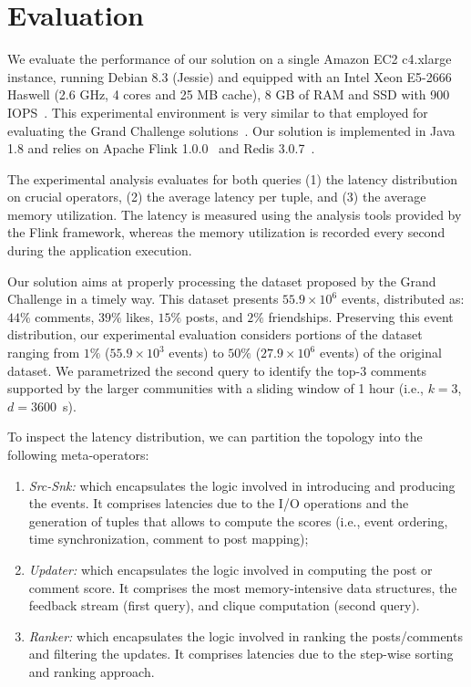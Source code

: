 \section{Evaluation}
\label{sec:evaluation}

We evaluate the performance of our solution on a single Amazon EC2 c4.xlarge instance, running Debian 8.3 (Jessie) and equipped with an Intel Xeon E5-2666 Haswell (2.6 GHz, 4 cores and 25 MB cache), 8 GB of RAM and SSD with 900 IOPS~\cite{AWSEC2InstanceTypes}. This experimental environment is very similar to that employed for evaluating the Grand Challenge solutions~\cite{GrandChallenge:2016}. 
%
Our solution is implemented in Java 1.8 and relies on Apache Flink 1.0.0~\cite{Flink} and Redis 3.0.7~\cite{Redis}.

The experimental analysis evaluates for both queries 
(1) the latency distribution on crucial operators, 
(2) the average latency per tuple,  
and (3) the average memory utilization.
%
The latency is measured using the analysis tools provided by the Flink framework, whereas the memory utilization is recorded every second during the application execution.

Our solution aims at properly processing the dataset proposed by the Grand Challenge in a timely way. This dataset presents $ 55.9 \times 10^6 $ events, distributed as: $ 44 \% $ comments, $ 39\% $ likes, $ 15\% $ posts, and $ 2\% $ friendships.
%
Preserving this event distribution, our experimental evaluation considers portions of the dataset ranging from $ 1\% $ ($ 55.9 \times 10^3 $ events) to $ 50\% $ ($ 27.9 \times 10^6 $ events) of the original dataset.
%
We parametrized the second query to identify the top-$3$ comments supported by the larger communities with a sliding window of 1 hour (i.e., $k = 3 $, $d = 3600 $~s).

To inspect the latency distribution, we can partition the topology into the following meta-operators: 
\begin{enumerate} \itemsep0em
	\item \textit{Src-Snk:} 
	which encapsulates the logic involved in introducing and producing the events. It comprises latencies due to the I/O operations and the generation of tuples that allows to compute the scores (i.e., event ordering, time synchronization, comment to post mapping);
	\item \textit{Updater:} 
	which encapsulates the logic involved in computing the post or comment score. It comprises the most memory-intensive data structures, the feedback stream (first query), and clique computation (second query).
	\item \textit{Ranker:} 
	which encapsulates the logic involved in ranking the posts/comments and filtering the updates. It comprises latencies due to the step-wise sorting and ranking approach. 
\end{enumerate}

